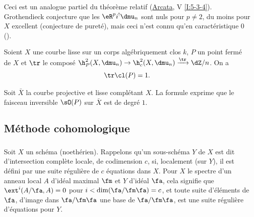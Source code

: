 Ceci est un analogue partiel du théorème relatif 
(\hyperref[I]{Arcata}, V \ref{I:5-3-4}). Grothendieck conjecture 
que les $\eR^p i^! \dmu_n$ sont nuls pour $p\ne 2$, du moins pour $X$ excellent 
(conjecture de pureté), mais ceci n'est connu qu'en caractéristique $0$ 
(\cite[XIX]{sga4}). 




\begin{theorem}\label{IV:2-1-5}
Soient $X$ une courbe lisse sur un corps algébriquement clos $k$, $P$ un 
point fermé de $X$ et $\tr$ le composé $\h_P^2(X,\dmu_n) \to \h_c^2(X,\dmu_n) \xrightarrow{\tr} \dZ/n$. On a 
\[
  \tr \cl(P) = 1 \text{.}
\]
\end{theorem}

Soit $\bar X$ la courbe projective et lisse complétant $X$. La formule 
exprime que le faisceau inversible $\sO(P)$ sur $\bar X$ est de degré $1$. 










\subsection{Méthode cohomologique}\label{IV:2-2}





\subsubsection{}\label{IV:2-2-1}

Soit $X$ un schéma (noethérien). Rappelons qu'un sous-schéma $Y$ de $X$ 
est dit d'intersection complète locale, de codimension $c$, si, localement 
(sur $Y$), il est défini par une suite régulière de $c$ équations dans 
$X$. Pour $X$ le spectre d'un anneau local $A$ d'idéal maximal $\fm$ et 
$Y$ d'idéal $\fa$, cela signifie que $\ext^i(A/\fa,A) = 0$ pour 
$i<\dim(\fa/\fm\fa)=c$, et toute suite d'éléments de $\fa$, d'image dans 
$\fa/\fm\fa$ une base de $\fa/\fm\fa$, est une suite régulière 
d'équations pour $Y$. 





\subsubsection{}\label{IV:2-2-2}

